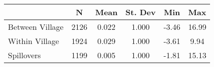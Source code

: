 \begin{tabular}{l*{5}{c}}\hline&\multicolumn{1}{c}{N}&\multicolumn{1}{c}{Mean}&\multicolumn{1}{c}{St. Dev}&\multicolumn{1}{c}{Min}&\multicolumn{1}{c}{Max}\\ \hline 
Between Village & 2126 & 0.022 & 1.000 & -3.46 & 16.99 \\
Within Village & 1924 & 0.029 & 1.000 & -3.61 & 9.94 \\
Spillovers & 1199 & 0.005 & 1.000 & -1.81 & 15.13 \\
\hline \end{tabular}
